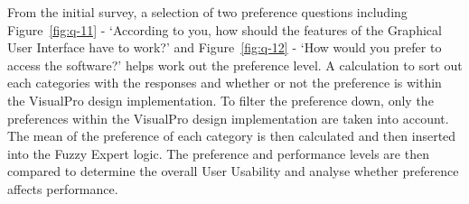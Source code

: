 \documentclass[a0,portrait]{a0poster}
\begin{document}
\begin{multicols}{2}
From the initial survey, a selection of two preference questions including Figure~\ref{fig:q-11} - `According to you, how should the features of the Graphical User Interface have to work?' and Figure~\ref{fig:q-12} - `How would you prefer to access the software?' helps work out the preference level. A calculation to sort out each categories with the responses and whether or not the preference is within the VisualPro design implementation. To filter the preference down, only the preferences within the VisualPro design implementation are taken into account. The mean of the preference of each category is then calculated and then inserted into the Fuzzy Expert logic. The preference and performance levels are then compared to determine the overall User Usability and analyse whether preference affects performance.


\end{multicols}
\end{document}
